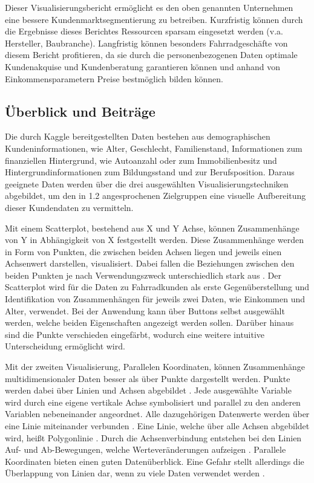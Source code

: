 \documentclass[usegeometry=true]{scrartcl}
\begin{document}
Dieser Visualisierungsbericht ermöglicht es den oben genannten Unternehmen eine bessere Kundenmarktsegmentierung zu betreiben.  Kurzfristig können durch die Ergebnisse dieses Berichtes Ressourcen sparsam eingesetzt werden (v.a. Hersteller, Baubranche). Langfristig können besonders Fahrradgeschäfte von diesem Bericht profitieren, da sie durch die personenbezogenen Daten optimale Kundenakquise und Kundenberatung garantieren können und anhand von Einkommensparametern Preise bestmöglich bilden können. 



\subsection{Überblick und Beiträge}
Die durch Kaggle bereitgestellten Daten bestehen aus demographischen Kundeninformationen, wie Alter, Geschlecht, Familienstand,  Informationen zum finanziellen Hintergrund, wie Autoanzahl oder zum Immobilienbesitz und Hintergrundinformationen zum Bildungsstand und zur Berufsposition. Daraus geeignete Daten werden über die drei ausgewählten Visualisierungstechniken  abgebildet, um den in 1.2 angesprochenen Zielgruppen eine visuelle Aufbereitung dieser Kundendaten zu vermitteln. 

Mit einem Scatterplot, bestehend aus X und Y Achse, können Zusammenhänge von Y in Abhängigkeit von X festgestellt werden. Diese Zusammenhänge werden in Form von Punkten, die zwischen beiden Achsen liegen und jeweils einen Achsenwert darstellen, visualisiert. Dabei fallen die Beziehungen zwischen den beiden Punkten je nach Verwendungszweck unterschiedlich stark aus \cite{Yi.16.10.2019,Anscombe.1973,Cleveland.1984}. Der Scatterplot wird für die Daten zu Fahrradkunden als erste Gegenüberstellung und Identifikation von Zusammenhängen für jeweils zwei Daten, wie Einkommen und Alter, verwendet. 
Bei der Anwendung kann über Buttons selbst ausgewählt werden, welche beiden Eigenschaften angezeigt werden sollen. Darüber hinaus sind die Punkte verschieden eingefärbt, wodurch eine weitere intuitive Unterscheidung ermöglicht wird. 

Mit der zweiten Visualisierung, Parallelen Koordinaten, können Zusammenhänge multidimensionaler Daten besser als über Punkte dargestellt werden. Punkte werden dabei über Linien und Achsen abgebildet \cite{Inselberg.1990}. Jede ausgewählte Variable wird durch eine eigene vertikale Achse symbolisiert und parallel zu den anderen Variablen nebeneinander angeordnet. Alle dazugehörigen Datenwerte werden über eine Linie miteinander verbunden \cite{Moustafa.2006}. Eine Linie, welche über alle Achsen abgebildet wird, heißt Polygonlinie \cite{Heinrich.2015}. Durch die Achsenverbindung entstehen bei den Linien Auf- und Ab-Bewegungen, welche Werteveränderungen aufzeigen \cite{Few.2008}. Parallele Koordinaten bieten einen guten Datenüberblick. Eine Gefahr stellt allerdings die Überlappung von Linien dar, wenn zu viele Daten verwendet werden \cite{Heinrich.2009}.
\end{document}

